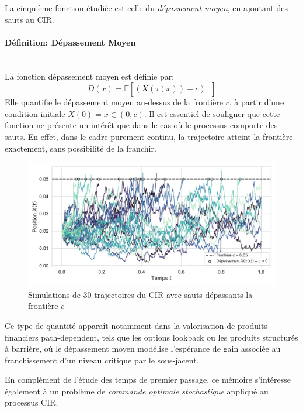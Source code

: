 La cinquième fonction étudiée est celle du \textit{dépassement moyen}, en ajoutant des sauts au \acs{CIR}.
\paragraph{Définition: Dépassement Moyen}\mbox{}\\
La fonction dépassement moyen est définie par: 
\begin{equation}\label{overshoot}
    D(x)=\mathds{E}\left[(X(\tau(x))-c)_+\right]
\end{equation}
Elle quantifie le dépassement moyen au-dessus de la frontière \( c \), à partir d'une condition initiale \( X(0) = x \in (0, c) \). Il est essentiel de souligner que cette fonction ne présente un intérêt que dans le cas où le processus comporte des sauts. En effet, dans le cadre purement continu, la trajectoire atteint la frontière exactement, sans possibilité de la franchir.
\begin{figure}[htb]
    \centering
    \includegraphics[width=0.9\linewidth]{img/intro/overshoot.pdf}
    \caption{Simulations de 30 trajectoires du \acs{CIR} avec sauts dépassants la frontière $c$}\label{fig:OvershootViz}
\end{figure}
\FloatBarrier Ce type de quantité apparaît notamment dans la valorisation de produits financiers path-dependent, tels que les options lookback ou les produits structurés à barrière, où le dépassement moyen modélise l'espérance de gain associée au franchissement d'un niveau critique par le sous-jacent. 

En complément de l'étude des temps de premier passage, ce mémoire s'intéresse également à un problème de \textit{commande optimale stochastique} appliqué au processus \acs{CIR}.\\
